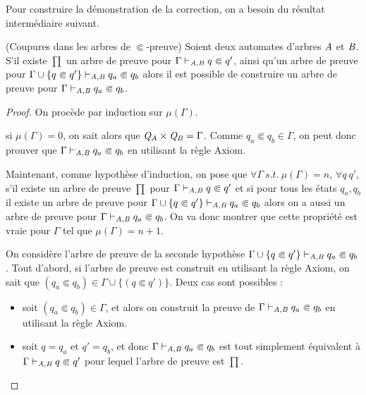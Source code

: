 Pour construire la démonstration de la correction, on a besoin du résultat intermédiaire suivant.

\begin{lemma}{(Coupures dans les arbres de $\Subset$-preuve)}
  \label{lem:cut}
  Soient deux automates d'arbres $\mathit A$ et $\mathit B$. S'il existe $\prod$ un arbre de preuve
  pour $\Gamma \vdash_{\mathit A, \mathit B} q \Subset q'$, ainsi qu'un arbre de preuve pour
  $\Gamma \cup \{q \Subset q'\}\vdash_{\mathit A, \mathit B} q_a \Subset q_b$
  alors il est possible de construire un arbre de preuve pour $\Gamma \vdash_{\mathit A, \mathit B} q_a \Subset q_b$.
\end{lemma}

\begin{proof}
  On procède par induction sur $\mu(\Gamma)$.
  
  \noindent
  si $\mu(\Gamma) = 0$, on sait alors que $\mathit Q_\mathit A \times \mathit Q_\mathit B = \Gamma$.
  Comme $q_a \Subset q_b \in \Gamma$, on peut donc prouver que 
  $\Gamma \vdash_{\mathit A,\mathit B} q_a \Subset q_b$ en utilisant la règle Axiom.
  
  \medskip
  \noindent
  Maintenant, comme hypothèse d'induction, on pose que $\forall \Gamma\  s.t.\ \mu(\Gamma) = n$, $\forall q\ q'$,
  s'il existe un arbre de preuve $\prod$ pour $\Gamma \vdash_{\mathit A, \mathit B} q \Subset q'$ et si pour tous les états $q_a, q_b$
  il existe un arbre de preuve pour $\Gamma \cup \{q \Subset q'\}\vdash_{\mathit A, \mathit B} q_a \Subset q_b$ alors on a aussi
  un arbre de preuve pour $\Gamma \vdash_{\mathit A, \mathit B} q_a \Subset q_b$. On va donc montrer que cette propriété est vraie
  pour $\Gamma$ tel que $\mu(\Gamma) = n+1$.
  
  \medskip
  \noindent
  On considère l'arbre de preuve de la seconde hypothèse $\Gamma \cup \{q \Subset
  q'\}\vdash_{\mathit A, \mathit B} q_a \Subset q_b$.  Tout d'abord, si l'arbre de preuve est construit 
  en utilisant la règle Axiom, on sait que $(q_a \Subset q_b) \in \Gamma \cup \{(q \Subset
  q')\}$.  Deux cas sont possibles :
  \begin{itemize}
  \item soit $(q_a \Subset q_b) \in \Gamma$, et alors on construit la preuve de 
    $\Gamma \vdash_{\mathit A,\mathit B} q_a \Subset q_b$ en utilisant la règle Axiom.
    
  \item soit $q = q_a$ et $q' = q_b$, et donc $\Gamma \vdash_{\mathit A,\mathit B} q_a
    \Subset q_b$ est tout simplement équivalent à $\Gamma \vdash_{\mathit A, \mathit B} q \Subset q'$ pour lequel
    l'arbre de preuve est $\prod$.
  \end{itemize}
  

\end{proof}

